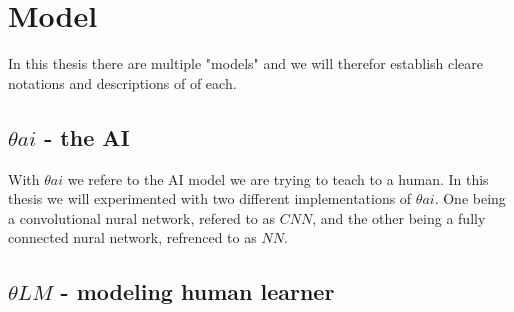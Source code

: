\chapter{Model}

In this thesis there are multiple "models" and we will therefor establish cleare notations and descriptions of 
of each.

\section{$\theta{ai}$ - the AI}

With $\theta{ai}$ we refere to the AI model we are trying to teach to a human. 
In this thesis we will experimented with two different implementations of $\theta{ai}$. 
One being a convolutional nural network, refered to as $CNN$, and the other being a fully connected nural network, refrenced to as $NN$.

\section{$\theta{LM}$ - modeling human learner}
